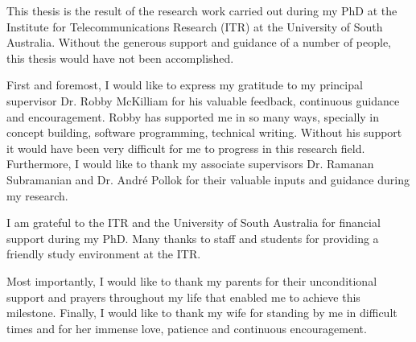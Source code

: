 This thesis is the result of the research work carried out during my PhD at the Institute for Telecommunications Research (ITR) at the University of South Australia. Without the generous support and guidance of a number of people, this thesis would have not been accomplished.

First and foremost, I would like to express my gratitude to my principal supervisor Dr. Robby McKilliam for his valuable feedback, continuous guidance and encouragement. Robby has supported me in so many ways, specially in concept building, software programming, technical writing. Without his support it would have been very difficult for me to progress in this research field. Furthermore, I would like to thank my associate supervisors Dr. Ramanan Subramanian and Dr. Andr\'e Pollok for their valuable inputs and guidance during my research. 

I am grateful to the ITR and the University of South Australia for financial support during my PhD. Many thanks to staff and students for providing a friendly study environment at the ITR.

Most importantly, I would like to thank my parents for their unconditional support and prayers throughout my life that enabled me to achieve this milestone. Finally, I would like to thank my wife for standing by me in difficult times and for her immense love, patience and continuous encouragement. 